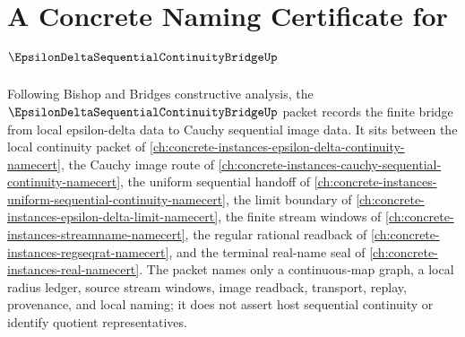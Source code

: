\chapter{A Concrete Naming Certificate for $\EpsilonDeltaSequentialContinuityBridgeUp$}
\label{ch:concrete-instances-epsilon-delta-sequential-continuity-bridge-namecert}

Following Bishop and Bridges constructive analysis, the $\EpsilonDeltaSequentialContinuityBridgeUp$ packet records the finite bridge from local epsilon-delta data to Cauchy sequential image data. It sits between the local continuity packet of \autoref{ch:concrete-instances-epsilon-delta-continuity-namecert}, the Cauchy image route of \autoref{ch:concrete-instances-cauchy-sequential-continuity-namecert}, the uniform sequential handoff of \autoref{ch:concrete-instances-uniform-sequential-continuity-namecert}, the limit boundary of \autoref{ch:concrete-instances-epsilon-delta-limit-namecert}, the finite stream windows of \autoref{ch:concrete-instances-streamname-namecert}, the regular rational readback of \autoref{ch:concrete-instances-regseqrat-namecert}, and the terminal real-name seal of \autoref{ch:concrete-instances-real-namecert}. The packet names only a continuous-map graph, a local radius ledger, source stream windows, image readback, transport, replay, provenance, and local naming; it does not assert host sequential continuity or identify quotient representatives.

